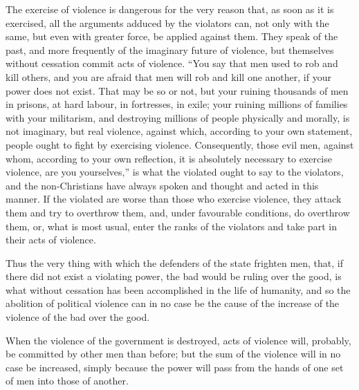 \documentclass{book}
\begin{document}
The exercise of violence is dangerous for the very reason that, as soon as it is exercised, all the arguments adduced by the violators can, not only with the same, but even with greater force, be applied against them. They speak of the past, and more frequently of the imaginary future of violence, but themselves without cessation commit acts of violence. “You say that men used to rob and kill others, and you are afraid that men will rob and kill one another, if your power does not exist. That may be so or not, but your ruining thousands of men in prisons, at hard labour, in fortresses, in exile; your ruining millions of families with your militarism, and destroying millions of people physically and morally, is not imaginary, but real violence, against which, according to your own statement, people ought to fight by exercising violence. Consequently, those evil men, against whom, according to your own reflection, it is absolutely necessary to exercise violence, are you yourselves,” is what the violated ought to say to the violators, and the non-Christians have always spoken and thought and acted in this manner. If the violated are worse than those who exercise violence, they attack them and try to overthrow them, and, under favourable conditions, do overthrow them, or, what is most usual, enter the ranks of the violators and take part in their acts of violence.

Thus the very thing with which the defenders of the state frighten men, that, if there did not exist a violating power, the bad would be ruling over the good, is what without cessation has been accomplished in the life of humanity, and so the abolition of political violence can in no case be the cause of the increase of the violence of the bad over the good.

When the violence of the government is destroyed, acts of violence will, probably, be committed by other men than before; but the sum of the violence will in no case be increased, simply because the power will pass from the hands of one set of men into those of another.
\end{document}

